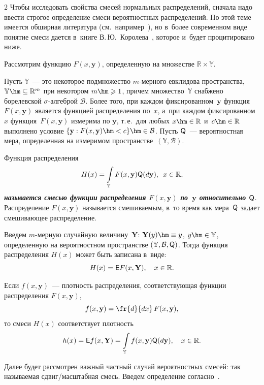 \begin{multicols}{2}
Чтобы исследовать свойства смесей нормальных распределений, сначала надо ввести 
строгое определение смеси вероятностных распределений. По этой теме имеется обширная 
литература (см.\ например~\cite{teicher_60, teicher_63}), но в~более современном виде 
понятие смеси дается в~книге В.\,Ю.~Королева~\cite{korolev}, которое и~будет процитировано ниже.

Рассмотрим функцию $F (x, \textbf{y})$, определенную на множестве $\mathbb{R} \times \mathbb{Y}.$

Пусть $\mathbb{Y}$~--- это некоторое подмножество $m$-мер\-но\-го 
евклидова пространства, $\mathbb{Y}\hm\subseteq\mathbb{R}^m$ при некотором $m \hm\geqslant 1$, 
причем множество~$\mathbb{Y}$ снабжено борелевской $\sigma$-ал\-геб\-рой $\mathcal{B}$. 
Более того, при каждом фиксированном~$\textbf{y}$ функция $F (x, \mathbf{y})$ 
является функцией распределения по~$x$, а~при каждом фиксированном~$x$ функция~$F (x, \mathbf{y})$ 
измерима по $\mathbf{y}$, т.\,е.\ для любых $x \hm\in \mathbb{R}$ и~$c \hm\in \mathbb{R}$ 
выполнено условие $\{\mathbf{y} : F (x, \mathbf{y}) \hm< c\} \hm\in \mathcal{B}$. Пусть 
${\sf Q}$~--- вероятностная мера, определенная на измеримом пространстве~$(\mathbb{Y}, \mathcal{B})$.

Функция распределения
$$
        H(x) = \int\limits_ \mathbb{Y} F (x, \mathbf{y}) {\sf Q} (d\mathbf{y}), \enskip  x \in \mathbb{R},
$$
{\bfseries\textit{называется смесью функции распределения $F (x, \textbf{y})$ по~$\textbf{y}$
 относительно $\sf Q$}}. Распределение $F (x, \mathbf{y})$ называется смешиваемым, в~то время как мера~$\sf Q$ 
 задает смешивающее распределение.

Введем $m$-мерную случайную величину~$\mathbf{Y}$: $\mathbf{Y}(y) \hm\equiv y$, $y \hm\in \mathbb{Y}$,  
определенную на вероятностном пространстве $(\mathbb{Y}, \mathcal{B},{\sf Q})$. Тогда
функция распределения $H(x)$ может быть записана в~виде:
$$
        H(x) = {\sf E} F (x, \mathbf{Y}), \quad  x \in \mathbb{R}.
$$

Если $f(x, \mathbf{y})$~--- плотность распределения, соответствующая функции 
распределения $F (x, \mathbf{y})$,
$$
f(x, \mathbf{y}) = \fr{d}{dx} \, F (x,\mathbf{y}),
$$
то смеси $H(x)$ соответствует плотность
$$
        h(x) = {\sf E} f(x, \mathbf{Y}) = \int\limits_ \mathbb{Y} f(x, \textbf{y}) 
        {\sf Q} (d\mathbf{y}), \quad  x \in \mathbb{R}.
$$

Далее будет рассмотрен важный частный случай вероятностных смесей: 
так называемая сдвиг/мас\-штаб\-ная смесь. Введем определение согласно~\cite{korolev}.


\end{multicols}

